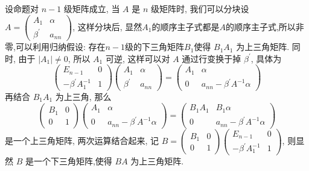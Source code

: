 \documentclass{article}
\begin{document}
设命题对 $n-1$ 级矩阵成立, 当 $A$ 是 $n$ 级矩阵时, 我们可以分块设 $A=\left(\begin{array}{cc}A_{1} & \alpha \\ \beta^{\prime} & a_{n n}\end{array}\right)$, 这样分块后, 显然$A_1$的顺序主子式都是$A$的顺序主子式,所以非零,可以利用归纳假设: 存在$n - 1$级的下三角矩阵$B_1$使得 $B_{1} A_{1}$ 为上三角矩阵. 同时, 由于 $\left|A_{1}\right| \neq 0$, 所以 $A_{1}$ 可逆, 这样可以对 $A$ 通过行变换于掉 $\beta^{\prime}$, 具体为
\begin{equation*}
    \left(\begin{array}{cc}
        E_{n-1}                    & 0 \\
        -\beta^{\prime} A_{1}^{-1} & 1
    \end{array}\right)\left(\begin{array}{cc}
        A_{1}          & \alpha  \\
        \beta^{\prime} & a_{n n}
    \end{array}\right)=\left(\begin{array}{cc}
        A_{1} & \alpha                               \\
        0     & a_{n n}-\beta^{\prime} A^{-1} \alpha
    \end{array}\right)
\end{equation*}
再结合 $B_{1} A_{1}$ 为上三角, 那么
\begin{equation*}
    \left(\begin{array}{cc}
        B_{1} & 0 \\
        0     & 1
    \end{array}\right)\left(\begin{array}{cc}
        A_{1} & \alpha                               \\
        0     & a_{n n}-\beta^{\prime} A^{-1} \alpha
    \end{array}\right)=\left(\begin{array}{cc}
        B_{1} A_{1} & B_{1} \alpha                         \\
        0           & a_{n n}-\beta^{\prime} A^{-1} \alpha
    \end{array}\right)
\end{equation*}
是一个上三角矩阵, 两次运算结合起来, 记 $B=\left(\begin{array}{cc}B_{1} & 0 \\ 0 & 1\end{array}\right)\left(\begin{array}{cc}E_{n-1} & 0 \\ -\beta^{\prime} A_{1}^{-1} & 1\end{array}\right)$, 则显然 $B$ 是一个下三角矩阵,使得 $B A$ 为上三角矩阵.
\end{document}
